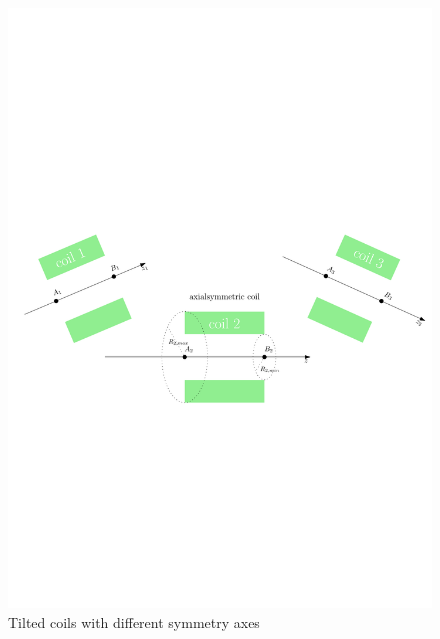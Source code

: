 	\begin{figure}[h]
		\centering \includegraphics[width=1.0\textwidth]{images/KAFCAFigures/tilted_coils.pdf}
		\caption{Tilted coils with different symmetry axes}
	  \label{fig:tilted coils}
	\end{figure}
%
%
%
